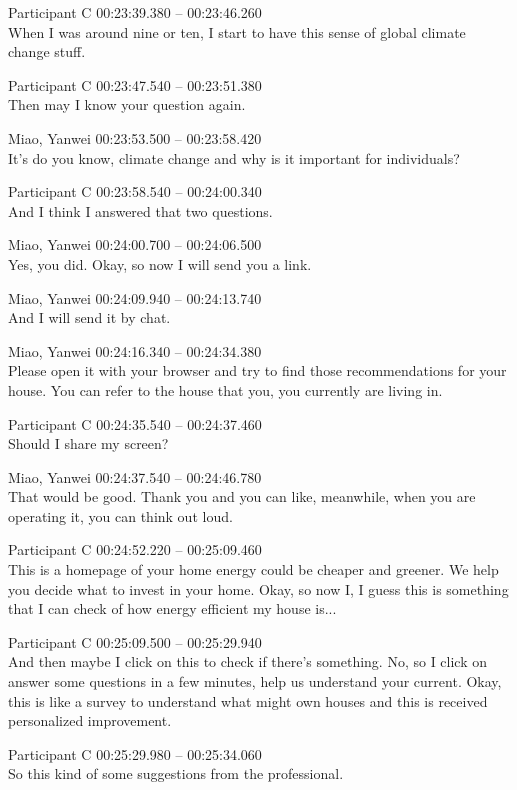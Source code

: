 {Participant C 00:23:39.380 -- 00:23:46.260 \\
When I was around nine or ten, I start to have this sense of global climate change stuff.

Participant C 00:23:47.540 -- 00:23:51.380 \\
Then may I know your question again.

Miao, Yanwei 00:23:53.500 -- 00:23:58.420 \\
It's do you know, climate change and why is it important for individuals?

Participant C 00:23:58.540 -- 00:24:00.340 \\
And I think I answered that two questions.

Miao, Yanwei 00:24:00.700 -- 00:24:06.500 \\
Yes, you did. Okay, so now I will send you a link.

Miao, Yanwei 00:24:09.940 -- 00:24:13.740 \\
And I will send it by chat.

Miao, Yanwei 00:24:16.340 -- 00:24:34.380 \\
Please open it with your browser and try to find those recommendations for your house. You can refer to the house that you, you currently are living in.

Participant C 00:24:35.540 -- 00:24:37.460 \\
Should I share my screen?

Miao, Yanwei 00:24:37.540 -- 00:24:46.780 \\
That would be good. Thank you and you can like, meanwhile, when you are operating it, you can think out loud.

Participant C 00:24:52.220 -- 00:25:09.460 \\
This is a homepage of your home energy could be cheaper and greener. We help you decide what to invest in your home. Okay, so now I, I guess this is something that I can check of how energy efficient my house is...

Participant C 00:25:09.500 -- 00:25:29.940 \\
And then maybe I click on this to check if there's something. No, so I click on answer some questions in a few minutes, help us understand your current. Okay, this is like a survey to understand what might own houses and this is received personalized improvement.

Participant C 00:25:29.980 -- 00:25:34.060 \\
So this kind of some suggestions from the professional.

}
